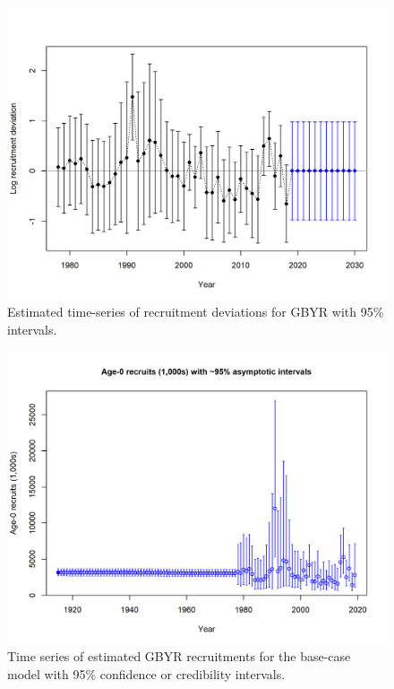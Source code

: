 \documentclass[12pt,]{article}
\begin{document}
\FloatBarrier

\begin{figure}
\centering
\includegraphics{r4ss/plots_mod1/recdevs2_withbars.png}
\caption{Estimated time-series of recruitment deviations for GBYR with
95\% intervals. \label{fig:recdevs2_withbars}}
\end{figure}

\begin{figure}
\centering
\includegraphics{r4ss/plots_mod1/ts11_Age-0_recruits_(1000s)_with_95_asymptotic_intervals.png}
\caption{Time series of estimated GBYR recruitments for the base-case
model with 95\% confidence or credibility intervals.
\label{fig:Recruit_mod1}}
\end{figure}
\end{document}
